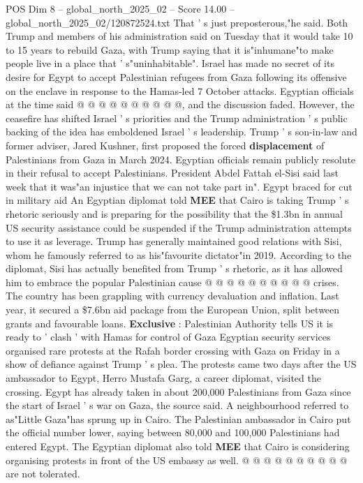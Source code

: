 \begin{textsample}{POS Dim 8 – global\_north\_2025\_02 – Score 14.00 – global\_north\_2025\_02/120872524.txt}
That ' s just preposterous,"he said.
Both Trump and members of his administration said on Tuesday that it would take 10 to 15 years to rebuild Gaza, with Trump saying that it is"inhumane"to make people live in a place that ' s"uninhabitable".
Israel has made no secret of its desire for Egypt to accept Palestinian refugees from Gaza following its offensive on the enclave in response to the Hamas-led 7 October attacks.
Egyptian officials at the time said @ @ @ @ @ @ @ @ @ @, and the discussion faded.
However, the ceasefire has shifted Israel ' s priorities and the Trump administration ' s public backing of the idea has emboldened Israel ' s leadership.
Trump ' s son-in-law and former adviser, Jared Kushner, first proposed the forced \textbf{displacement} of Palestinians from Gaza in March 2024.
Egyptian officials remain publicly resolute in their refusal to accept Palestinians.
President Abdel Fattah el-Sisi said last week that it was"an injustice that we can not take part in".
Egypt braced for cut in military aid An Egyptian diplomat told \textbf{MEE} that Cairo is taking Trump ' s rhetoric seriously and is preparing for the possibility that the \$1.3bn in annual US security assistance could be suspended if the Trump administration attempts to use it as leverage.
Trump has generally maintained good relations with Sisi, whom he famously referred to as his"favourite dictator"in 2019.
According to the diplomat, Sisi has actually benefited from Trump ' s rhetoric, as it has allowed him to embrace the popular Palestinian cause @ @ @ @ @ @ @ @ @ @ crises.
The country has been grappling with currency devaluation and inflation.
Last year, it secured a \$7.6bn aid package from the European Union, split between grants and favourable loans. \textbf{Exclusive} : Palestinian Authority tells US it is ready to ' clash ' with Hamas for control of Gaza Egyptian security services organised rare protests at the Rafah border crossing with Gaza on Friday in a show of defiance against Trump ' s plea.
The protests came two days after the US ambassador to Egypt, Herro Mustafa Garg, a career diplomat, visited the crossing.
Egypt has already taken in about 200,000 Palestinians from Gaza since the start of Israel ' s war on Gaza, the source said.
A neighbourhood referred to as"Little Gaza"has sprung up in Cairo.
The Palestinian ambassador in Cairo put the official number lower, saying between 80,000 and 100,000 Palestinians had entered Egypt.
The Egyptian diplomat also told \textbf{MEE} that Cairo is considering organising protests in front of the US embassy as well. @ @ @ @ @ @ @ @ @ @ are not tolerated.

\end{textsample}
